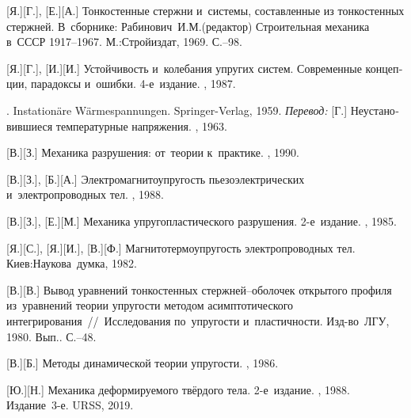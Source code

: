 \begin{thebibliography}{123}
\begin{otherlanguage}{russian}
[Я.][Г.], [Е.][А.] Тонкостенные стержни и~системы, составленные из тонкостенных стержней. В~сборнике: Рабинович~И.\:М.\:(редактор) Строительная механика в~СССР 1917\hbox{--}1967. М.:\;Строй\-издат, 1969. С.\hbox{--}98.

[Я.][Г.], [И.][И.] Устойчивость и~колебания упругих систем. Современные концепции, парадоксы и~ошибки. 4\hbox{-}е~издание. \naukapublisher, 1987. 

. Instation\"{a}re W\"{a}rmespannungen. Springer\hbox{-}Verlag, 1959. 
\emph{Перевод:} [Г.] Неустановившиеся температурные напряжения. \fizmatgiz, 1963. 

[В.][З.] Механика разрушения: от~теории к~практике. \naukapublisher, 1990. 

[В.][З.], [Б.][А.] Электромагнитоупругость пьезоэлектрических и~электропроводных тел. \naukapublisher, 1988. 

[В.][З.], [Е.][М.] Механика упругопластического разрушения. 2\hbox{-}е~издание. \naukapublisher, 1985. 

[Я.][С.], [Я.][И.], [В.][Ф.] Магнито\-термо\-упру\-гость электропроводных тел. Киев:\;Наукова~думка, 1982. 

[В.][В.] Вывод уравнений тонко\-стен\-ных стержней\hbox{--}обо\-ло\-чек открытого профиля из~уравнений теории упругости методом асимптотического интегрирования~//~Исследования по~упругости и~пластичности. Изд\hbox{-}во~ЛГУ, 1980. Вып.. С.\hbox{--}48.

[В.][Б.] Методы динамической теории упругости. \naukapublisher, 1986. 

[Ю.][Н.] Механика деформируемого твёрдого тела. 2\hbox{-}е~издание. \naukapublisher, 1988. Издание~3\hbox{-}е. URSS, 2019. 


\end{otherlanguage}
\end{thebibliography}
